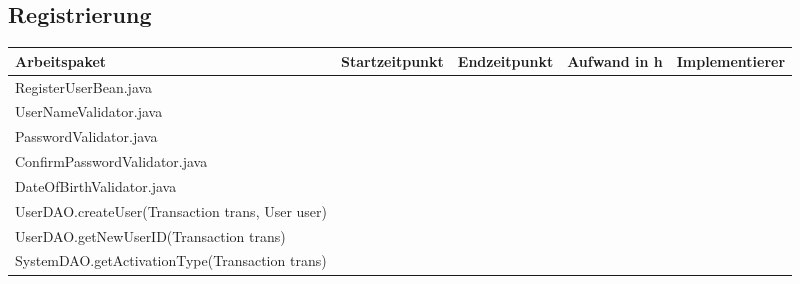 \begin{landscape}
\subsection{Registrierung}
\begin{tabular}{|p{10cm}|p{4cm}|p{3cm}|p{3cm}|p{3cm}|}
	\hline  \textbf{Arbeitspaket} & \textbf{Startzeitpunkt} & \textbf{Endzeitpunkt} & \textbf{Aufwand in h} & \textbf{Implementierer} \\ 
	\hline   RegisterUserBean.java                                &                            &                             &                     &\\
	\hline   UserNameValidator.java                               &                            &                             &                     &\\ 
	\hline   PasswordValidator.java                               &                            &                             &                     &\\ 
	\hline   ConfirmPasswordValidator.java                        &                            &                             &                     &\\
	\hline   DateOfBirthValidator.java                            &                            &                             &                     &\\
	\hline   UserDAO.createUser(Transaction trans, User user)     &                            &                             &                     &\\ 
	\hline   UserDAO.getNewUserID(Transaction trans)              &                            &                             &                     &\\
	\hline   SystemDAO.getActivationType(Transaction trans)       &                            &                             &                     &\\ 
	\hline 
\end{tabular} \ \\
\ \\


\end{landscape}
